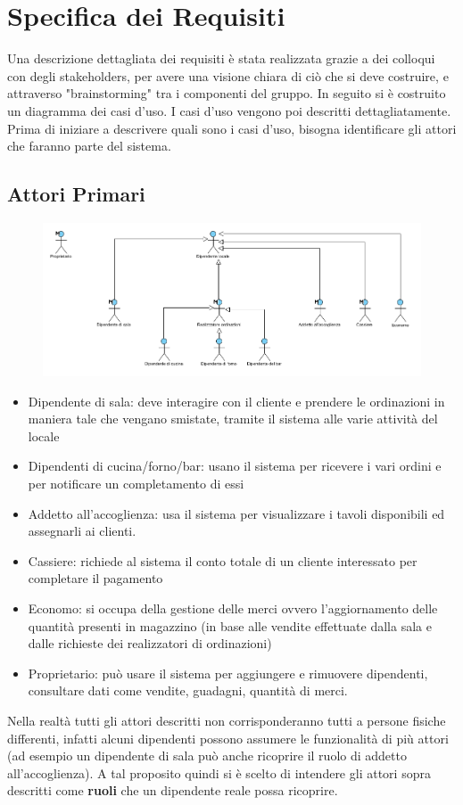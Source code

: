 \chapter{Specifica dei Requisiti}
Una descrizione dettagliata dei requisiti è stata realizzata grazie a dei colloqui con degli stakeholders, per avere una visione chiara di ciò che si deve costruire, e attraverso "brainstorming" tra i componenti del gruppo. In seguito si è costruito un diagramma dei casi d'uso. I casi d'uso vengono poi descritti dettagliatamente.
\\Prima di iniziare a descrivere quali sono i casi d'uso, bisogna identificare gli attori che faranno parte del sistema.

\section{Attori Primari}
\begin{figure}[H]
	\centering
	\includegraphics[width=\textwidth]{Immagini/AttoriPrimari.png}
\end{figure}

\begin{itemize}
	\item Dipendente di sala: deve interagire con il cliente e prendere le ordinazioni in maniera tale che vengano smistate, tramite il sistema alle varie attività del locale
	\item Dipendenti di cucina/forno/bar: usano il sistema per ricevere i vari ordini e per notificare un completamento di essi
	\item Addetto all'accoglienza: usa il sistema per visualizzare i tavoli disponibili ed assegnarli ai clienti.
	\item Cassiere: richiede al sistema il conto totale di un cliente interessato per completare il pagamento
	\item Economo: si occupa della gestione delle merci ovvero l'aggiornamento delle quantità presenti in magazzino (in base alle vendite effettuate dalla sala e dalle richieste dei realizzatori di ordinazioni)
	\item Proprietario: può usare il sistema per aggiungere e rimuovere dipendenti, consultare dati come vendite, guadagni, quantità di merci.
\end{itemize}
Nella realtà tutti gli attori descritti non corrisponderanno tutti a persone fisiche differenti, infatti alcuni dipendenti possono assumere le funzionalità di più attori (ad esempio un dipendente di sala può anche ricoprire il ruolo di addetto all'accoglienza). A tal proposito quindi si è scelto di intendere gli attori sopra descritti come \textbf{ruoli} che un dipendente reale possa ricoprire.

